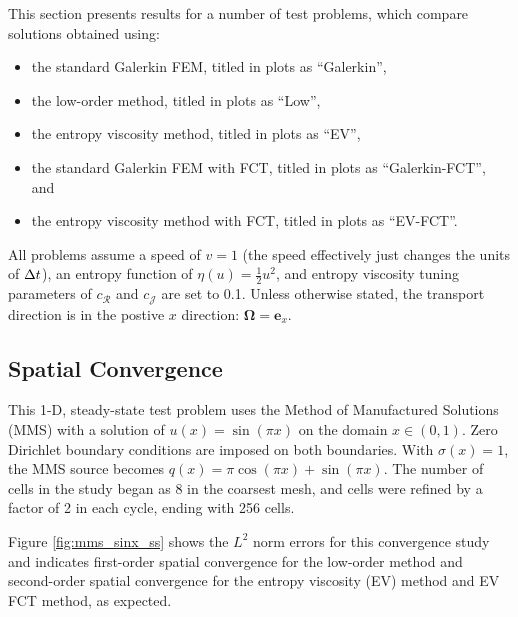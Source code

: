 
This section presents results for a number of test problems, which compare
solutions obtained using:
\begin{itemize}
  \item the standard Galerkin FEM, titled in plots as ``Galerkin'',
  \item the low-order method, titled in plots as ``Low'',
  \item the entropy viscosity method, titled in plots as ``EV'',
  \item the standard Galerkin FEM with FCT, titled in plots as ``Galerkin-FCT'', and
  \item the entropy viscosity method with FCT, titled in plots as ``EV-FCT''.
\end{itemize}
All problems assume a speed of $v=1$ (the speed effectively just changes the
units of $\Delta t$), an entropy function of $\eta(u)=\frac{1}{2}u^2$, and entropy
viscosity tuning parameters of $c_\mathcal{R}$ and $c_\mathcal{J}$ are set
to 0.1. Unless otherwise stated, the transport direction is in the postive
$x$ direction: $\mathbf{\Omega}=\mathbf{e}_x$.

\subsection{Spatial Convergence}
This 1-D, steady-state test problem uses the Method of Manufactured Solutions (MMS) with
a solution of $u(x)=\sin(\pi x)$ on the domain $x\in(0,1)$. Zero Dirichlet
boundary conditions are imposed on both boundaries.
With $\sigma(x)=1$,
the MMS source becomes $q(x)=\pi\cos(\pi x) + \sin(\pi x)$.
The number of cells in the study began as 8 in the coarsest mesh, and cells
were refined by a factor of 2 in each cycle, ending with 256 cells.

Figure \ref{fig:mms_sinx_ss} shows the $L^2$ norm errors for this convergence study
and indicates first-order spatial convergence for the low-order method and
second-order spatial convergence for the entropy viscosity (EV) method
and EV FCT method, as expected.

